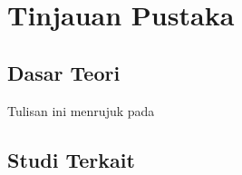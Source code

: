 \chapter{Tinjauan Pustaka}

\section{Dasar Teori}
\blindtext
Tulisan ini menrujuk pada \parencite{knuth2001art}

\section{Studi Terkait}
\blindtext